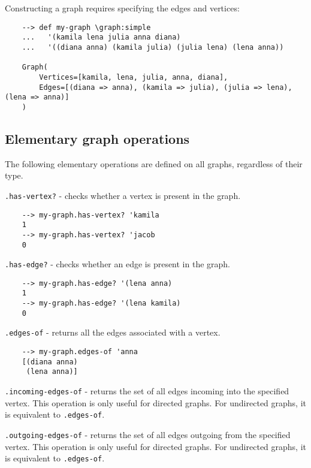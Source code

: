 \par \noindent Constructing a graph requires specifying the edges and vertices:

\begin{Verbatim}
    --> def my-graph \graph:simple 
    ...   '(kamila lena julia anna diana)
    ...   '((diana anna) (kamila julia) (julia lena) (lena anna))

    Graph(
        Vertices=[kamila, lena, julia, anna, diana],
        Edges=[(diana => anna), (kamila => julia), (julia => lena), (lena => anna)]
    )
\end{Verbatim}

\subsection{Elementary graph operations}

The following elementary operations are defined on all graphs, regardless of their type.

\vspace{0.25cm} \par \noindent \verb|.has-vertex?| - checks whether a vertex is present in the graph.

\begin{Verbatim}
    --> my-graph.has-vertex? 'kamila
    1
    --> my-graph.has-vertex? 'jacob
    0
\end{Verbatim}

\par \noindent \verb|.has-edge?| - checks whether an edge is present in the graph.

\begin{Verbatim}
    --> my-graph.has-edge? '(lena anna)
    1
    --> my-graph.has-edge? '(lena kamila)
    0
\end{Verbatim}

\par \noindent \verb|.edges-of| - returns all the edges associated with a vertex.

\begin{Verbatim}
    --> my-graph.edges-of 'anna
    [(diana anna)
     (lena anna)]
\end{Verbatim}

\par \noindent \verb|.incoming-edges-of| - returns the set of all edges incoming into the specified vertex. This operation is only useful for directed graphs. For undirected graphs, it is equivalent to \verb|.edges-of|.

\vspace{0.25cm} \par \noindent \verb|.outgoing-edges-of| - returns the set of all edges outgoing from the specified vertex. This operation is only useful for directed graphs. For undirected graphs, it is equivalent to \verb|.edges-of|.

